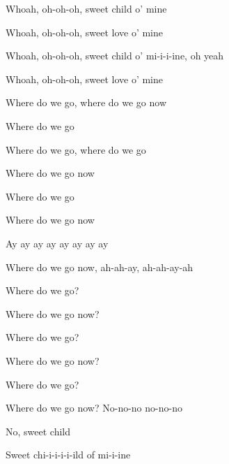 \begin{song}
\bigskip

Whoah, oh-oh-oh, sweet child o' mine \par
{}Whoah, oh-oh-oh, sweet love o' mine \par
{}Whoah, oh-oh-oh, sweet child o' mi-i-i-ine, oh yeah \par
{}Whoah, oh-oh-oh, sweet love o' mine \par

\bigskip

 \par
{}     \par


\bigskip

Where do we go, where do we go now \par
{}Where do we go    \par
{}Where do we go, where do we go \par
{}Where do we go now   \par
{}Where do we go   \par
{}Where do we go now   \par
{}Ay ay ay ay ay ay ay ay \par
{}Where do we go now, ah-ah-ay, ah-ah-ay-ah \par

\bigskip

Where do we go?  \par
{}Where do we go now?   \par
{}Where do we go?  \par
{}Where do we go now?   \par

Where do we go?  \par
{}Where do we go now? No-no-no no-no-no \par
{}No, sweet child \par
Sweet chi-i-i-i-i-ild of mi-i-ine \par

\end{song}
